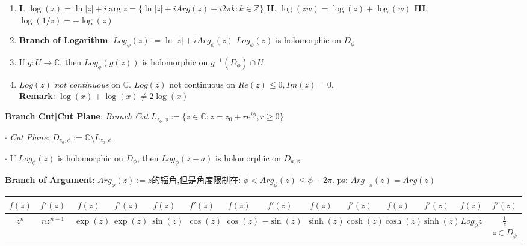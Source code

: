 \documentclass[9pt]{article}
\begin{document}
\begin{enumerate}[itemsep=-2pt, topsep=-2pt]
    \item \textbf{I}. $\log(z)=\ln |z|+i\arg{z}=\{\ln |z|+iArg(z) +i2\pi k:k\in\mathbb{Z}\}$ \quad \quad \textbf{II}. $\log(zw)=\log(z)+\log(w)$ \quad \quad \textbf{III}. $\log(1/z)=-\log(z)$
    \item \textbf{Branch of Logarithm}: $Log_{\phi}(z):=\ln|z|+iArg_{\phi}(z)$ \quad \quad $Log_\phi(z)$ is holomorphic on $D_{\phi}$ \\
    \noindent
    \vspace{-3cm}
    \item If $g:U\to\mathbb{C}$, then $Log_\phi(g(z))$ is holomorphic on $g^{-1}(D_{\phi})\cap U$
    \item $Log(z)$ \textit{not continuous} on $\mathbb{C}$. \quad \quad $Log(z)$ not continuous on $Re(z)\leq 0,Im(z)=0$. \\
    \textbf{Remark}: $\log(x)+\log(x)\ne 2\log(x)$
\end{enumerate}

\textbf{Branch Cut|Cut Plane}: \textit{Branch Cut} $L_{z_0,\phi}:=\{z\in\mathbb{C}:z=z_0+re^{i\phi},r\geq0\}$

$\cdot$ \textit{Cut Plane}: $D_{z_0,\phi}:=\mathbb{C}\setminus L_{z_0,\phi}$ 

$\cdot$ If $Log_{\phi}(z)$ is holomorphic on $D_{\phi}$, then $Log_{\phi}(z-a)$ is holomorphic on $D_{a,\phi}$

\textbf{Branch of Argument}: $Arg_{\phi}(z):=z${\small 的辐角,但是角度限制在:} $\phi<Arg_\phi(z)\leq \phi+2\pi$. \quad \quad ps: {\footnotesize $Arg_{-\pi}(z)=Arg(z)$}

\vspace{-10pt}
\begin{longtable}{cc|cc|cc|cc|cc|cc|cc}
    $f(z)$ & $f'(z)$ & $f(z)$ & $f'(z)$ & $f(z)$ & $f'(z)$ & $f(z)$ & $f'(z)$ & $f(z)$ & $f'(z)$ & $f(z)$ & $f'(z)$ & $f(z)$ & $f'(z)$ \\
    \hline
    $z^n$ & $nz^{n-1}$ & $\exp(z)$ & $\exp(z)$ & $\sin(z)$ & $\cos(z)$ & $\cos(z)$ & $-\sin(z)$ & $\sinh(z)$ & $\cosh(z)$ & $\cosh(z)$ & $\sinh(z)$ & $Log_\phi z$ & $\frac{1}{z}$ {\tiny $z\in D_{\phi}$} \\
\end{longtable}
\vspace{-10pt}
\end{document}
